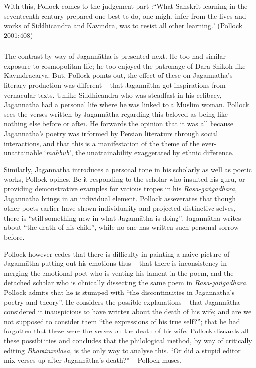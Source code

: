 With this, Pollock comes to the judgement part :“What Sanskrit learning in the seventeenth century prepared one best to do, one might infer from the lives and works of Siddhicandra and Kavīndra, was to resist all other learning.” (Pollock 2001:408)

\subsubsection{} The contrast by way of Jagannātha is presented next. He too had similar exposure to cosmopolitan life; he too enjoyed the patronage of Dara Shikoh like Kavīndrācārya. But, Pollock points out, the effect of these on Jagannātha’s literary production was different – that Jagannātha got inspirations from vernacular texts. Unlike Siddhicandra who was steadfast in his celibacy, Jagannātha had a personal life where he was linked to a Muslim woman. Pollock sees the verses written by Jagannātha regarding this beloved as being like nothing else before or after. He forwards the opinion that it was all because Jagannātha’s poetry was informed by Persian literature through social interactions, and that this is a manifestation of the theme of the ever-unattainable ‘{\sl mahbūb}’, the unattainability exaggerated by ethnic difference. 

Similarly, Jagannātha introduces a personal tone in his scholarly as well as poetic works, Pollock opines. Be it responding to the scholar who insulted his guru, or providing demonstrative examples for various tropes in his {\sl Rasa-gaṅgādhara}, Jagannātha brings in an individual element. Pollock asseverates that though other poets earlier have shown individuality and projected distinctive selves, there is “still something new in what Jagannātha is doing”. Jagannātha writes about “the death of his child”, while no one has written such personal sorrow before. 

Pollock however cedes that there is difficulty in painting a naive picture of Jagannātha putting out his emotions thus – that there is inconsistency in merging the emotional poet who is venting his lament in the poem, and the detached scholar who is clinically dissecting the same poem in {\sl Rasa-gaṅgādhara}. Pollock admits that he is stumped with “the discontinuities in Jagannātha’s poetry and theory”. He considers the possible explanations – that Jagannātha considered it inauspicious to have written about the death of his wife; and are we not supposed to consider them “the expressions of his true self?”; that he had forgotten that these were the verses on the death of his wife. Pollock discards all these possibilities and concludes that the philological method, by way of critically editing {\sl Bhāminīvilāsa}, is the only way to analyse this. “Or did a stupid editor mix verses up after Jagannātha’s death?” – Pollock muses.

